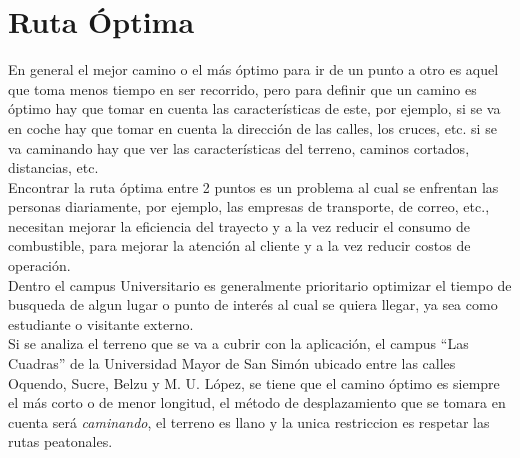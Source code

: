 \section{Ruta Óptima} %
\label{cha:ruta_optima}

En general el mejor camino o el más óptimo para ir de un punto a otro es aquel que toma menos tiempo en ser recorrido, pero para definir que un camino es óptimo hay que tomar en cuenta las características de este, por ejemplo, si se va en coche hay que tomar en cuenta la dirección de las calles, los cruces, etc. si se va caminando hay que ver las características del terreno, caminos cortados, distancias, etc.\\


Encontrar la ruta óptima entre 2 puntos es un problema al cual se enfrentan las personas diariamente, por ejemplo, las empresas de transporte, de correo, etc., necesitan mejorar la eficiencia del trayecto y a la vez reducir el consumo de combustible, para mejorar la atención al cliente y a la vez reducir costos de operación. \\

Dentro el campus Universitario es generalmente prioritario optimizar el tiempo de busqueda de algun lugar o punto de interés al cual se quiera llegar, ya sea como estudiante o visitante externo.\\


Si se analiza el terreno que se va a cubrir con la aplicación, el campus ``Las Cuadras'' de la Universidad Mayor de San Simón ubicado entre las calles Oquendo, Sucre,  Belzu y M. U. López, se tiene que el camino óptimo es siempre el más corto o de menor longitud, el método de desplazamiento que se tomara en cuenta será \emph{caminando}, el terreno es llano y la unica restriccion es respetar las rutas peatonales.\\


